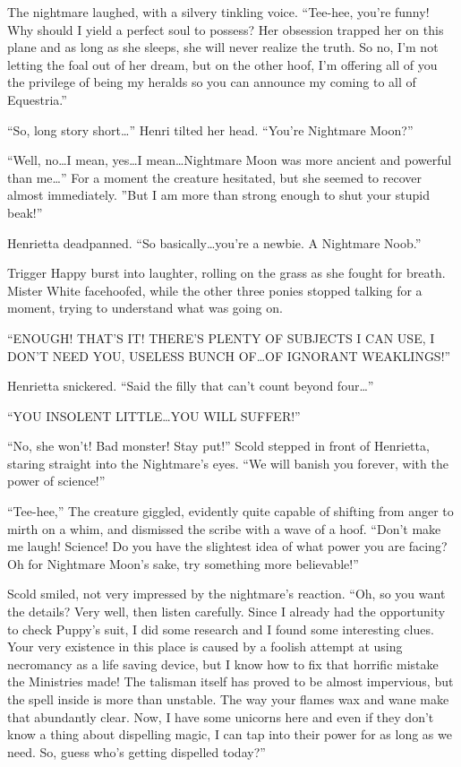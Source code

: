 The nightmare laughed, with a silvery tinkling voice. ``Tee-hee, you're funny! Why should I yield a perfect soul to possess? Her obsession trapped her on this plane and as long as she sleeps, she will never realize the truth. So no, I'm not letting the foal out of her dream, but on the other hoof, I'm offering all of you the privilege of being my heralds so you can announce my coming to all of Equestria.''

``So, long story short\dots'' Henri tilted her head. ``You're Nightmare Moon?''

``Well, no\dots I mean, yes\dots I mean\dots Nightmare Moon was more ancient and powerful than me\dots'' For a moment the creature hesitated, but she seemed to recover almost immediately. ''But I am more than strong enough to shut your stupid beak!''

Henrietta deadpanned. ``So basically\dots you're a newbie. A Nightmare Noob.''

Trigger Happy burst into laughter, rolling on the grass as she fought for breath. Mister White facehoofed, while the other three ponies stopped talking for a moment, trying to understand what was going on.

``ENOUGH! THAT'S IT! THERE'S PLENTY OF SUBJECTS I CAN USE, I DON'T NEED YOU, USELESS BUNCH OF\dots OF IGNORANT WEAKLINGS!''

Henrietta snickered. ``Said the filly that can't count beyond four\dots''

``YOU INSOLENT LITTLE\dots YOU WILL SUFFER!''

``No, she won't! Bad monster! Stay put!'' Scold stepped in front of Henrietta, staring straight into the Nightmare's eyes. ``We will banish you forever, with the power of science!''

``Tee-hee,'' The creature giggled, evidently quite capable of shifting from anger to mirth on a whim, and dismissed the scribe with a wave of a hoof. ``Don't make me laugh! Science! Do you have the slightest idea of what power you are facing? Oh for Nightmare Moon's sake, try something more believable!''

Scold smiled, not very impressed by the nightmare's reaction. ``Oh, so you want the details? Very well, then listen carefully. Since I already had the opportunity to check Puppy's suit, I did some research and I found some interesting clues. Your very existence in this place is caused by a foolish attempt at using necromancy as a life saving device, but I know how to fix that horrific mistake the Ministries made! The talisman itself has proved to be almost impervious, but the spell inside is more than unstable. The way your flames wax and wane make that abundantly clear. Now, I have some unicorns here and even if they don't know a thing about dispelling magic, I can tap into their power for as long as we need. So, guess who's getting dispelled today?''

